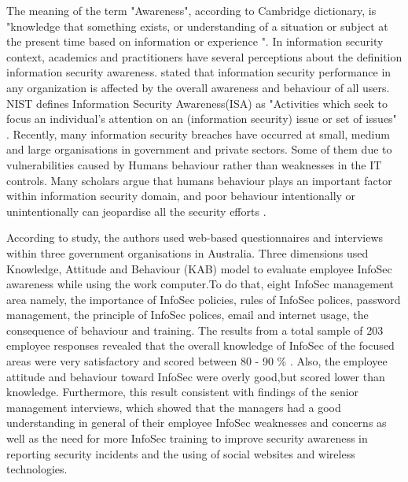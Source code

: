 The meaning of the term "Awareness", according to Cambridge dictionary, is "knowledge that something exists, or understanding of a situation or subject at the present time based on information or experience ".
In information security context, academics and practitioners have several perceptions about the definition information security awareness. \citet{Albrechtsen} stated that information security performance in any organization is affected by the overall awareness and behaviour of all users.   
NIST\cite{Kissel2013} defines Information Security Awareness(ISA) as "Activities which seek to focus an individual’s attention on an (information security) issue or set of issues" .  
Recently, many information security breaches have occurred at small, medium and large organisations in government and private sectors. Some of them due to vulnerabilities caused by Humans behaviour rather than  weaknesses in the IT controls. Many scholars argue that humans behaviour plays an important factor within information security domain, and poor behaviour intentionally or unintentionally can jeopardise all the security efforts \cite{Kruger2006,Butavicius2017,Bawazir2016,Giraldo2014,Lebek2013,McCormac2016,safa2015information,Benbasat2010a}.  

According to \citet{Parsons2013} study, the authors used web-based questionnaires and interviews within three government organisations in Australia. Three dimensions used Knowledge, Attitude and Behaviour (KAB) model to evaluate employee InfoSec awareness while using the work computer.To do that, eight InfoSec management area namely, the importance of InfoSec policies, rules of InfoSec polices, password management, the principle of InfoSec polices, email and internet usage, the consequence of behaviour and training. The results from a total sample of 203 employee responses revealed that the overall knowledge of InfoSec of the focused areas were very satisfactory and scored between 80 - 90 \% . Also, the employee attitude and behaviour toward InfoSec were overly good,but scored lower than knowledge. Furthermore, this result consistent with findings of the senior management interviews, which showed that the managers had a good understanding in general of their employee InfoSec weaknesses and concerns as well as the need for more InfoSec training to improve security awareness in reporting security incidents and the using of social websites and wireless technologies.
 

